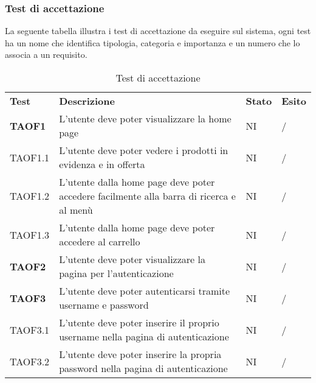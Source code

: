 \subsubsection{Test di accettazione}
La seguente tabella illustra i test di accettazione da eseguire sul sistema, ogni test ha un nome che identifica tipologia, categoria e importanza e un numero che lo associa a un requisito.
\begin{center}
    \centering
    \renewcommand{\arraystretch}{1.8}
    \label{tab:TestAccettazione}
    \begin{longtable}[!h]{p{60px} p{240px} p{35px} p{35px}}
        \caption{Test di accettazione}                                                                                                                          \\
        \rowcolor{logo!70}
        \textbf{Test}   & \textbf{Descrizione}                                                                                & \textbf{Stato} & \textbf{Esito} \\
        \textbf{TAOF1}  & L'utente deve poter visualizzare la home page                                                       & NI             & /              \\
        TAOF1.1         & L'utente deve poter vedere i prodotti in evidenza e in offerta                                      & NI             & /              \\
        TAOF1.2         & L'utente dalla home page deve poter accedere facilmente alla barra di ricerca e al menù             & NI             & /              \\
        TAOF1.3         & L'utente dalla home page deve poter accedere al carrello                                            & NI             & /              \\
        \textbf{TAOF2}  & L'utente deve poter visualizzare la pagina per l'autenticazione                                     & NI             & /              \\
        \textbf{TAOF3}  & L'utente deve poter autenticarsi tramite username e password                                        & NI             & /              \\
        TAOF3.1         & L'utente deve poter inserire il proprio username nella pagina di autenticazione                     & NI             & /              \\
        TAOF3.2         & L'utente deve poter inserire la propria password nella pagina di autenticazione                     & NI             & /              \\

\end{longtable}
\end{center}
